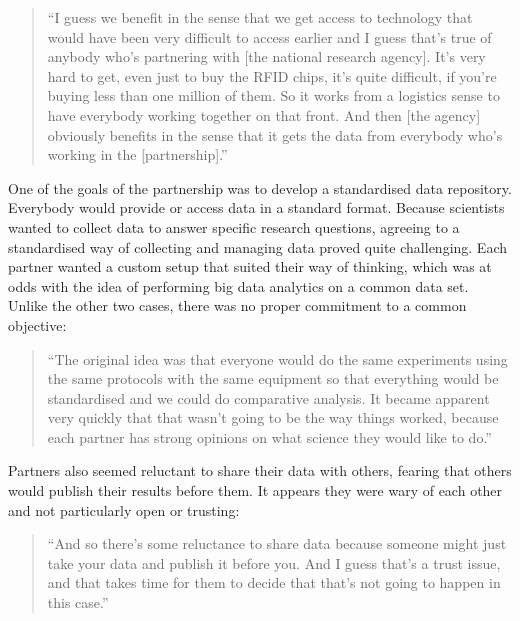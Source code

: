 \begin{quote}
\small
\enquote{I guess we benefit in the sense that we get access to technology that would have been very difficult to access earlier and I guess that's true of anybody who’s partnering with [the national research agency]. It's very hard to get, even just to buy the RFID chips, it's quite difficult, if you're buying less than one million of them. So it works from a logistics sense to have everybody working together on that front. And then [the agency] obviously benefits in the sense that it gets the data from everybody who's working in the [partnership].} \\
\end{quote}
 
One of the goals of the partnership was to develop a standardised data repository. Everybody would provide or access data in a standard format. Because scientists wanted to collect data to answer specific research questions, agreeing to a standardised way of collecting and managing data proved quite challenging. Each partner wanted a custom setup that suited their way of thinking, which was at odds with the idea of performing big data analytics on a common data set. Unlike the other two cases, there was no proper commitment to a common objective:

\begin{quote}
\small
\enquote{The original idea was that everyone would do the same experiments using the same protocols with the same equipment so that everything would be standardised and we could do comparative analysis. It became apparent very quickly that that wasn't going to be the way things worked, because each partner has strong opinions on what science they would like to do.} \\
\end{quote}

Partners also seemed reluctant to share their data with others, fearing that others would publish their results before them. It appears they were wary of each other and not particularly open or trusting:

\begin{quote}
\small
\enquote{And so there's some reluctance to share data because someone might just take your data and publish it before you. And I guess that's a trust issue, and that takes time for them to decide that that's not going to happen in this case.} \\
\end{quote}

